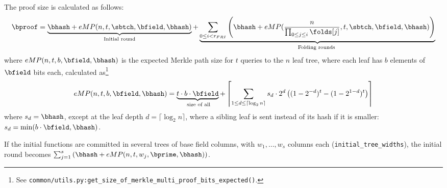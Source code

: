 The proof size is calculated as follows:
\begin{multline}
    \bproof =   \underbrace{ \bhash+  eMP(n,  t ,\sbtch,\bfield,\bhash)}_{\text{Initial round}} + \underbrace{\sum_{0\leq i < r_{FRI} } \left(\bhash+
      eMP(\frac{n}{\prod_{0\leq j \leq  i} \folds[j]},  t ,\sbtch,\bfield,\bhash)\right)}_{\text{Folding rounds }}
    \end{multline}
where $eMP(n, t, b, \bfield, \bhash)$ is the expected Merkle path size for $t$ queries to the $n$ leaf tree,
where each leaf has $b$ elements of $\bfield$ bits each,
calculated as\footnote{See \texttt{common/utils.py:get\_size\_of\_merkle\_multi\_proof\_bits\_expected()}.}
\begin{equation}
    eMP(n,t, b,\bfield,\bhash) =   \underbrace{t\cdot b\cdot \bfield}_{\text{ size of all}}
    +\left\lceil\sum_{1\leq d\leq \lceil \log_{2} n\rceil} s_d \cdot 2^d\left((1-2^{-d})^t-(1-2^{1-d})^t\right)\right\rceil
\end{equation}
where $s_d = \bhash$, except at the leaf depth $d = \lceil \log_2 n \rceil$, where a sibling leaf is sent instead of its hash if it is smaller: $s_d = \min(b\cdot\bfield, \bhash)$.

If the initial functions are committed in several trees of base field columns, with $w_1, \ldots, w_s$ columns each (\verb|initial_tree_widths|), the initial round becomes $\sum_{j=1}^{s} \left(\bhash + eMP(n, t, w_j, \bprime, \bhash)\right)$.

